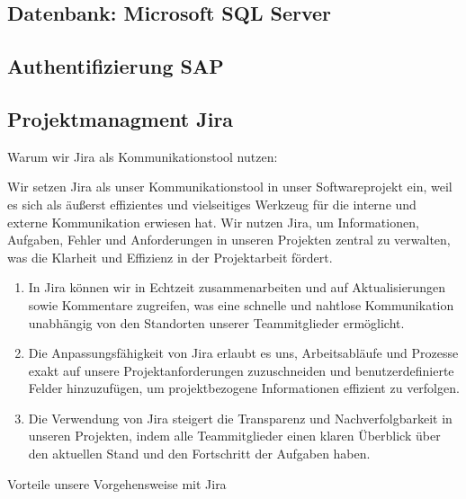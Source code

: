 \documentclass{article}
\begin{document}
\subsection{Datenbank: Microsoft SQL Server}
\subsection{Authentifizierung SAP}
\subsection{Projektmanagment Jira}
Warum wir Jira als Kommunikationstool nutzen:

Wir setzen Jira als unser Kommunikationstool in unser Softwareprojekt ein, weil
es sich als äußerst effizientes und vielseitiges Werkzeug für die interne und
externe Kommunikation erwiesen hat. Wir nutzen Jira, um Informationen,
Aufgaben, Fehler und Anforderungen in unseren Projekten zentral zu verwalten,
was die Klarheit und Effizienz in der Projektarbeit fördert.
\begin{enumerate}
    \item In Jira können wir in Echtzeit zusammenarbeiten und auf Aktualisierungen sowie
          Kommentare zugreifen, was eine schnelle und nahtlose Kommunikation unabhängig
          von den Standorten unserer Teammitglieder ermöglicht.
    \item Die Anpassungsfähigkeit von Jira erlaubt es uns, Arbeitsabläufe und Prozesse
          exakt auf unsere Projektanforderungen zuzuschneiden und benutzerdefinierte
          Felder hinzuzufügen, um projektbezogene Informationen effizient zu verfolgen.
    \item Die Verwendung von Jira steigert die Transparenz und Nachverfolgbarkeit in
          unseren Projekten, indem alle Teammitglieder einen klaren Überblick über den
          aktuellen Stand und den Fortschritt der Aufgaben haben.

\end{enumerate}
Vorteile unsere Vorgehensweise mit Jira
\end{document}

